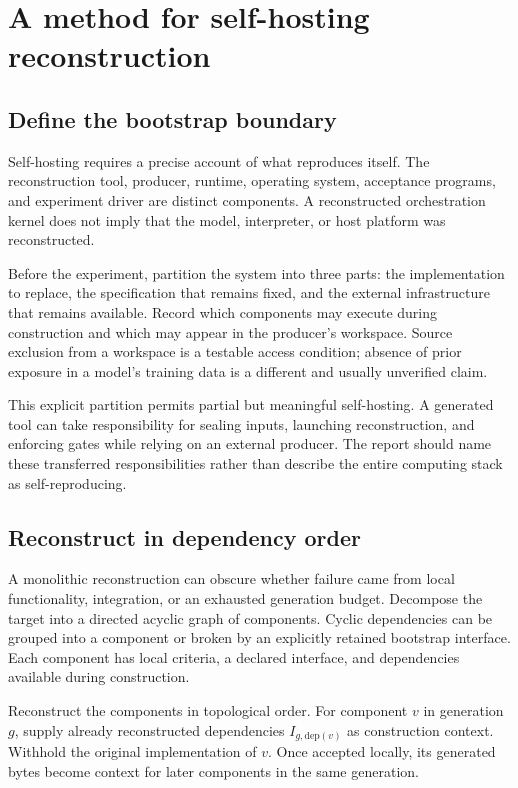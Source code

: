 \documentclass[10pt,twocolumn,letterpaper]{article}
\begin{document}
\section{A method for self-hosting reconstruction}
\label{sec:method}
\subsection{Define the bootstrap boundary}
Self-hosting requires a precise account of what reproduces itself. The reconstruction tool, producer, runtime, operating system, acceptance programs, and experiment driver are distinct components. A reconstructed orchestration kernel does not imply that the model, interpreter, or host platform was reconstructed.

Before the experiment, partition the system into three parts: the implementation to replace, the specification that remains fixed, and the external infrastructure that remains available. Record which components may execute during construction and which may appear in the producer's workspace. Source exclusion from a workspace is a testable access condition; absence of prior exposure in a model's training data is a different and usually unverified claim.

This explicit partition permits partial but meaningful self-hosting. A generated tool can take responsibility for sealing inputs, launching reconstruction, and enforcing gates while relying on an external producer. The report should name these transferred responsibilities rather than describe the entire computing stack as self-reproducing.

\subsection{Reconstruct in dependency order}
A monolithic reconstruction can obscure whether failure came from local functionality, integration, or an exhausted generation budget. Decompose the target into a directed acyclic graph of components. Cyclic dependencies can be grouped into a component or broken by an explicitly retained bootstrap interface. Each component has local criteria, a declared interface, and dependencies available during construction.

Reconstruct the components in topological order. For component $v$ in generation $g$, supply already reconstructed dependencies $I_{g,\mathrm{dep}(v)}$ as construction context. Withhold the original implementation of $v$. Once accepted locally, its generated bytes become context for later components in the same generation.
\end{document}
